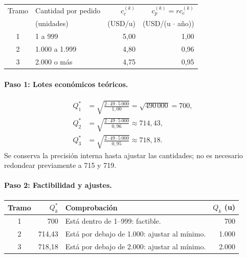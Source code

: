 \documentclass[11pt,a4paper]{article}
\begin{document}
\begin{center}
    \renewcommand{\arraystretch}{1.2}
    \begin{tabular}{@{}clrr@{}}
        \toprule
        Tramo & Cantidad por pedido & $c_c^{(k)}$ & $c_p^{(k)}=r c_c^{(k)}$ \\
              & (unidades)          & (USD/u)     & (USD/(u $\cdot$ año))   \\
        \midrule
        1     & 1 a 999             & 5,00        & 1,00                    \\
        2     & 1.000 a 1.999       & 4,80        & 0,96                    \\
        3     & 2.000 o más         & 4,75        & 0,95                    \\
        \bottomrule
    \end{tabular}
\end{center}

\paragraph{Paso 1: Lotes económicos teóricos.}
\begin{align*}
    Q_1^{*} & =\sqrt{\frac{2\cdot49\cdot5\,000}{1{,}00}}
    =\sqrt{490\,000}=700,                                \\
    Q_2^{*} & =\sqrt{\frac{2\cdot49\cdot5\,000}{0{,}96}}
    \approx714{,}43,                                     \\
    Q_3^{*} & =\sqrt{\frac{2\cdot49\cdot5\,000}{0{,}95}}
    \approx718{,}18.
\end{align*}
Se conserva la precisión interna hasta ajustar las cantidades; no es necesario redondear previamente a 715 y 719.

\paragraph{Paso 2: Factibilidad y ajustes.}
\begin{center}
    \renewcommand{\arraystretch}{1.2}
    \begin{tabularx}{\textwidth}{@{}crXr@{}}
        \toprule
        Tramo & $Q_k^{*}$ & Comprobación                                 & $Q_k$ (u) \\
        \midrule
        1     & 700       & Está dentro de 1--999: factible.             & 700       \\
        2     & 714,43    & Está por debajo de 1.000: ajustar al mínimo. & 1.000     \\
        3     & 718,18    & Está por debajo de 2.000: ajustar al mínimo. & 2.000     \\
        \bottomrule
    \end{tabularx}
\end{center}
\end{document}
